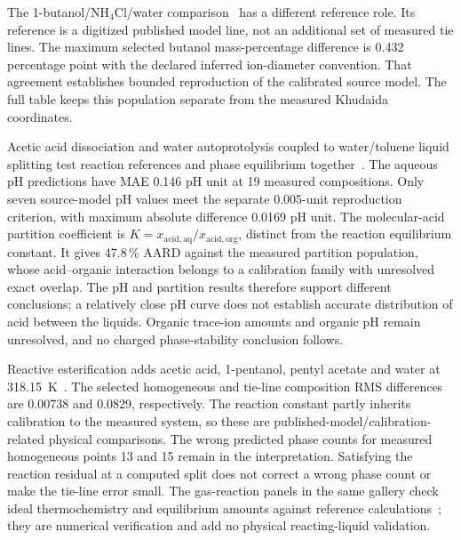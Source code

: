 The 1-butanol/NH$_4$Cl/water comparison~\citep{Held2014} has a different reference role.
Its reference is a digitized published model line, not an additional set of measured tie lines.
The maximum selected butanol mass-percentage difference is 0.432 percentage point with the declared inferred ion-diameter convention.
That agreement establishes bounded reproduction of the calibrated source model.
The full table keeps this population separate from the measured Khudaida coordinates.

Acetic acid dissociation and water autoprotolysis coupled to water/toluene liquid splitting test reaction references and phase equilibrium together~\citep{Ascani2022pH}.
The aqueous pH predictions have MAE 0.146 pH unit at 19 measured compositions.
Only seven source-model pH values meet the separate 0.005-unit reproduction criterion, with maximum absolute difference 0.0169 pH unit.
The molecular-acid partition coefficient is $K=x_{\mathrm{acid,aq}}/x_{\mathrm{acid,org}}$, distinct from the reaction equilibrium constant.
It gives 47.8\,\% AARD against the measured partition population, whose acid--organic interaction belongs to a calibration family with unresolved exact overlap.
The pH and partition results therefore support different conclusions; a relatively close pH curve does not establish accurate distribution of acid between the liquids.
Organic trace-ion amounts and organic pH remain unresolved, and no charged phase-stability conclusion follows.

Reactive esterification adds acetic acid, 1-pentanol, pentyl acetate and water at 318.15~K~\citep{Ascani2023,Senina2022}.
The selected homogeneous and tie-line composition RMS differences are 0.00738 and 0.0829, respectively.
The reaction constant partly inherits calibration to the measured system, so these are published-model/calibration-related physical comparisons.
The wrong predicted phase counts for measured homogeneous points 13 and 15 remain in the interpretation.
Satisfying the reaction residual at a computed split does not correct a wrong phase count or make the tie-line error small.
The gas-reaction panels in the same gallery check ideal thermochemistry and equilibrium amounts against reference calculations~\citep{linstromNISTChemistryWebBook1997,Belov2023}; they are numerical verification and add no physical reacting-liquid validation.



